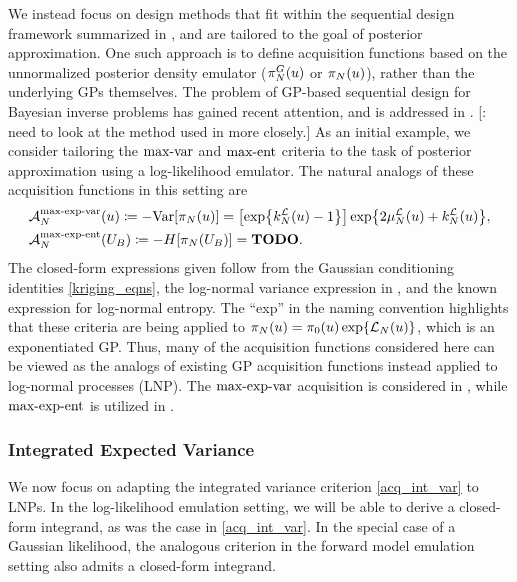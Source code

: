 \documentclass[12pt]{article}
\begin{document}
We instead focus on design methods that fit within the sequential design framework summarized in , and 
are tailored to the goal of posterior approximation. One such approach is to define acquisition functions based on 
the unnormalized posterior density emulator ($\fwdEmRdm[\Ndesign]{\postDens}(\Par)$ or $\llikEmRdmDens[\Ndesign](\Par)$), 
rather than the underlying GPs themselves. The problem of GP-based sequential design for Bayesian inverse problems  
has gained recent attention, and is addressed in 
\cite{SinsbeckNowak, Surer2023sequential, VehtariParallelGP, briol2017sampling, ranjan2016inverse, 
	landslideCalibration, KandasamyActiveLearning2015, Kandasamy_2017, wang2018adaptive,   
	weightedIVAR, quantileApprox, hydrologicalModel, briol2017sampling}. 
[\todo: need to look at the method used in \cite{quantileApprox, hydrologicalModel} more closely.]
As an initial example, we consider tailoring the $\maxvarLabel$ and $\maxentLabel$ criteria to the task of posterior approximation 
using a log-likelihood emulator. The natural analogs of these acquisition functions in this setting are 
\begin{align}
&\labelAcq[\Ndesign]{\maxexpvarLabel}(\Par) \Def -\Var[\llikEmRdmDens[\Ndesign](\Par)] 
= \left[\Exp{\emKer[\Ndesign]{\llik}(\Par) - 1} \right] \Exp{2\emMean[\Ndesign]{\llik}(\Par) + \emKer[\Ndesign]{\llik}(\Par)}, \\ 
&\labelAcq[\Ndesign]{\maxexpentLabel}(\designBatchIn) \Def -\Ent[\llikEmRdmDens[\Ndesign](\designBatchIn)]
= \todo. \label{acq_max_exp_var_ent}
\end{align} 
The closed-form expressions given follow from the Gaussian conditioning identities \ref{kriging_eqns}, the log-normal 
variance expression in , and the known expression for log-normal entropy. 
The ``exp'' in the naming convention highlights that these criteria are being applied to
$\llikEmRdmDens[\Ndesign](\Par) = \priorDens(\Par) \Exp{\llikEm(\Par)}$, which is an exponentiated GP. 
Thus, many of the acquisition functions 
considered here can be viewed as the analogs of existing GP acquisition functions instead applied to log-normal 
processes (LNP). The $\maxexpvarLabel$ acquisition is considered in 
\cite{KandasamyActiveLearning2015, Kandasamy_2017}, 
while $\maxexpentLabel$ is utilized in \cite{wang2018adaptive, landslideCalibration}. 

\subsubsection{Integrated Expected Variance}
We now focus on adapting the integrated variance criterion \ref{acq_int_var} to LNPs. 
In the log-likelihood emulation 
setting, we will be able to derive a closed-form integrand, as was the case in \ref{acq_int_var}. In the special case 
of a Gaussian likelihood, the analogous criterion in the forward model emulation setting also admits a closed-form 
integrand. 
\end{document}
